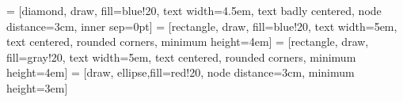 
\usepackage{setspace}
\usepackage{afterpage}
\usepackage{xcolor}

\onehalfspacing

\setlength{\parindent}{0em}

 = [diamond, draw, fill=blue!20, text width=4.5em, text badly centered, node distance=3cm, inner sep=0pt]
 = [rectangle, draw, fill=blue!20, text width=5em, text centered, rounded corners, minimum height=4em]
 = [rectangle, draw, fill=gray!20, text width=5em, text centered, rounded corners, minimum height=4em]
 = [draw, ellipse,fill=red!20, node distance=3cm, minimum height=3em]



\newcommand{\vader}{\textsc{vader}\,}
\newcommand{\usdv}{\textsc{usdv}\,}
\newcommand{\aphra}{\textsc{aphra}\,}
\newcommand{\frax}{\textsc{frax}\,}
\newcommand{\fxs}{\textsc{fxs}\,}
\newcommand{\bean}{\textsc{bean}\,}
\newcommand{\eth}{\textsc{eth}\,}
\newcommand{\cvx}{\textsc{cvx}\,}
\newcommand{\crv}{\textsc{crv}\,}
\newcommand{\rpl}{\textsc{rpl}\,}
\newcommand{\yfi}{\textsc{yfi}\,}



